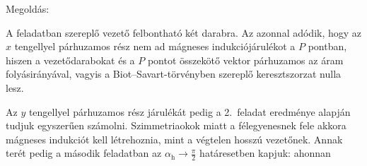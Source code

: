 
\ifdefined\megoldas
  
 Megoldás: 

 A feladatban szereplő vezető felbontható két darabra. Az azonnal adódik, hogy az $x$ tengellyel párhuzamos rész nem ad mágneses indukciójárulékot a $P$ pontban, hiszen a vezetődarabokat és a $P$ pontot összekötő vektor párhuzamos az áram folyásirányával, vagyis a Biot--Savart-törvényben szereplő keresztszorzat nulla lesz. 

 Az $y$ tengellyel párhuzamos rész járulékát pedig a 2.~feladat eredménye alapján tudjuk egyszerűen számolni. Szimmetriaokok miatt a félegyenesnek fele akkora mágneses indukciót kell létrehoznia, mint a végtelen hosszú vezetőnek. Annak terét pedig a második feladatban az $\alpha_\text{h}\to\frac{\pi}{2}$ határesetben kapjuk:
 ahonnan
 
\fi